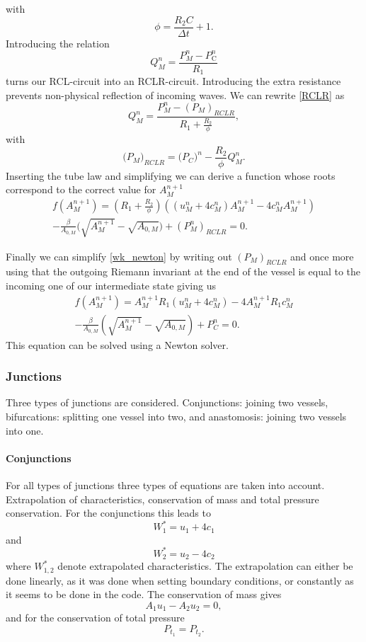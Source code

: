 \documentclass[a4paper, oneside]{discothesis}
\begin{document}
	with 
	\begin{equation}
		\phi = \frac{R_{2}C}{\Delta t} + 1. 
	\end{equation}
	Introducing the relation
	\begin{equation}
		Q_M^n={\frac{P_M^n-P_{\mathrm{C}}^{n}}{R_{1}}} \label{RCLR}
	\end{equation}
	turns our RCL-circuit into an RCLR-circuit.
	Introducing the extra resistance prevents non-physical reflection of incoming waves.
	We can rewrite \ref{RCLR} as 
	\begin{equation}
		Q_M^n={\frac{P_M^n-(P_{M})_{R C L R}}{R_{1}+{\frac{R_{2}}{\phi}}}}, 
	\end{equation}
	with 
	\begin{equation}
		\bigl(P_{M}\bigr)_{RCLR}=\bigl(P_{C}\bigr)^{n}-{\frac{R_{2}}{\phi}}Q_M^n.
	\end{equation}
	Inserting the tube law and simplifying we can derive a function whose roots correspond to the correct value for $A_M^{n+1}$
	\begin{multline}
		f(A_M^{n+1}) = \left(R_{1}+{\frac{R_{2}}{\phi}}\right)\left( \left(u_{M}^n+4c_{M}^n \right)A_M^{n+1}-4c_M^nA_M^{n+1} \right) \\
		-{\frac{\beta}{A_{0,M}}}\Big(\sqrt{A_M^{n+1}}-\sqrt{A_{0,M}}\Big)+(P_{M}^n)_{R C L R} =0. \label{wk_newton}
	\end{multline}

	Finally we can simplify \ref{wk_newton} by writing out $(P_{M})_{RCLR}$ and once more using that the outgoing Riemann invariant at the end of the vessel is equal to the incoming one of our intermediate state giving us
	\begin{multline}
		f\left(A_M^{n+1}\right) = A_M^{n+1} R_1\left(u_M^n+4 c_M^n\right)-4 A_M^{n+1} R_1 c_M^n\\
		-\frac{\beta}{A_{0,M}}\left(\sqrt{A_M^{n+1}}-\sqrt{A_{0,M}}\right)+P_C^n = 0. \label{wk_eq3}
	\end{multline}
	This equation can be solved using a Newton solver.

	\subsubsection{Junctions} \label{sssec:junctions}
	Three types of junctions are considered.
	Conjunctions: joining two vessels, bifurcations: splitting one vessel into two, and anastomosis: joining two vessels into one.
	\paragraph{Conjunctions} \label{par:conjunctions}
	For all types of junctions three types of equations are taken into account. 
	Extrapolation of characteristics, conservation of mass and total pressure conservation.
	For the conjunctions this leads to
	$$
	W_1^*=u_1+4 c_1
	$$
	and 
	$$
	W_2^*=u_2-4 c_2
	$$
	where $W_{1,2}^*$ denote extrapolated characteristics. 
	The extrapolation can either be done linearly, as it was done when setting boundary conditions, or constantly as it seems to be done in the code. 
	The conservation of mass gives
	$$A_1 u_1-A_2 u_2=0,$$
	and for the conservation of total pressure
	$$P_{t_1}=P_{t_2}.$$
\end{document}

